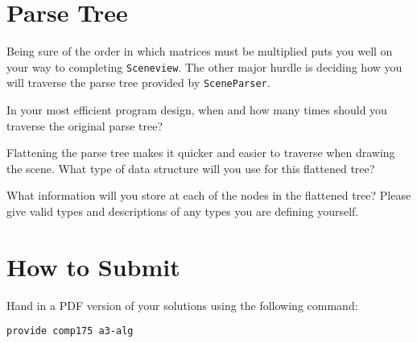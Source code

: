 \documentclass[10pt,twocolumn]{article}
\begin{document}
\begin{framed}
\vspace{12em}
\end{framed}


\section{Parse Tree}
Being sure of the order in which matrices must be multiplied puts you well on your way to completing {\tt Sceneview}. The other major hurdle is deciding how you will traverse the parse tree provided by {\tt SceneParser}.
\begin{framed}
\noindent {\bf [1 point]} In your most efficient program design, when and how many times should you traverse the original parse tree?
\vspace{10em}
\end{framed}
\begin{framed}
\noindent {\bf [1 point]} Flattening the parse tree makes it quicker and easier to traverse when drawing the scene. What type of data structure will you use for this flattened tree?
\vspace{10em}
\end{framed}
\begin{framed}
\noindent {\bf [1 point]} What information will you store at each of the nodes in the flattened tree? Please give valid types and descriptions of any types you are defining yourself.
\vspace{10em}
\end{framed}

\section{How to Submit}

Hand in a PDF version of your solutions using the following command:
\begin{center}
 {\tt provide comp175 a3-alg}
 \end{center}
\end{document}

